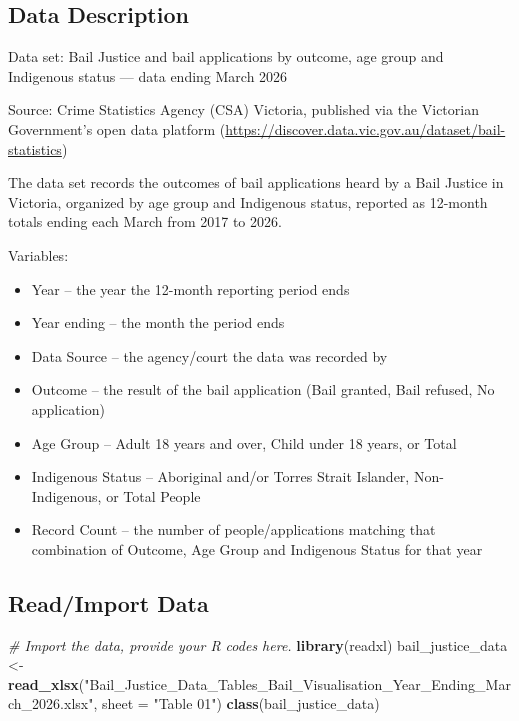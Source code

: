 \documentclass[
]{article}
\newenvironment{Shaded}{\begin{snugshade}}{\end{snugshade}}
\newcommand{\AttributeTok}[1]{\textcolor[rgb]{0.13,0.29,0.53}{#1}}
\newcommand{\CommentTok}[1]{\textcolor[rgb]{0.56,0.35,0.01}{\textit{#1}}}
\newcommand{\FunctionTok}[1]{\textcolor[rgb]{0.13,0.29,0.53}{\textbf{#1}}}
\newcommand{\NormalTok}[1]{#1}
\newcommand{\OtherTok}[1]{\textcolor[rgb]{0.56,0.35,0.01}{#1}}
\newcommand{\StringTok}[1]{\textcolor[rgb]{0.31,0.60,0.02}{#1}}
\providecommand{\tightlist}{%
  \setlength{\itemsep}{0pt}\setlength{\parskip}{0pt}}
\begin{document}
\subsection{\texorpdfstring{\textbf{Data
Description}}{Data Description}}\label{data-description}

Data set: Bail Justice and bail applications by outcome, age group and
Indigenous status --- data ending March 2026

Source: Crime Statistics Agency (CSA) Victoria, published via the
Victorian Government's open data platform
(\url{https://discover.data.vic.gov.au/dataset/bail-statistics})

The data set records the outcomes of bail applications heard by a Bail
Justice in Victoria, organized by age group and Indigenous status,
reported as 12-month totals ending each March from 2017 to 2026.

Variables:

\begin{itemize}
\tightlist
\item
  Year -- the year the 12-month reporting period ends
\item
  Year ending -- the month the period ends
\item
  Data Source -- the agency/court the data was recorded by
\item
  Outcome -- the result of the bail application (Bail granted, Bail
  refused, No application)
\item
  Age Group -- Adult 18 years and over, Child under 18 years, or Total
\item
  Indigenous Status -- Aboriginal and/or Torres Strait Islander,
  Non-Indigenous, or Total People
\item
  Record Count -- the number of people/applications matching that
  combination of Outcome, Age Group and Indigenous Status for that year
\end{itemize}

\subsection{\texorpdfstring{\textbf{Read/Import
Data}}{Read/Import Data}}\label{readimport-data}

\begin{Shaded}
\begin{Highlighting}[]
\CommentTok{\# Import the data, provide your R codes here.}
\FunctionTok{library}\NormalTok{(readxl)}
\NormalTok{bail\_justice\_data }\OtherTok{\textless{}{-}} \FunctionTok{read\_xlsx}\NormalTok{(}\StringTok{"Bail\_Justice\_Data\_Tables\_Bail\_Visualisation\_Year\_Ending\_March\_2026.xlsx"}\NormalTok{, }\AttributeTok{sheet =} \StringTok{"Table 01"}\NormalTok{)}
\FunctionTok{class}\NormalTok{(bail\_justice\_data)}
\end{Highlighting}
\end{Shaded}
\end{document}
